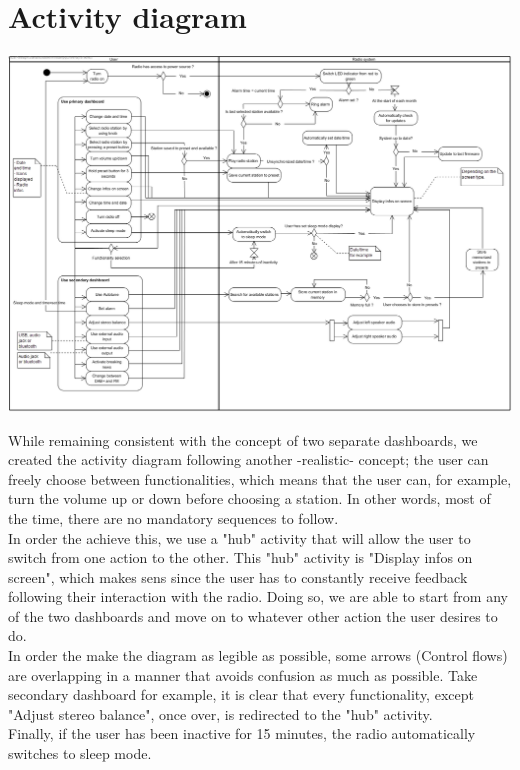 \documentclass[11pt]{article}
\begin{document}
\pagebreak
\section{Activity diagram}
\vspace{10px}
\begin{center}
\includegraphics[width=15cm]{../Diagrams/Activity-v5.jpg}\\
\end{center}
While remaining consistent with the concept of two separate dashboards, we created the activity diagram following another -realistic- concept; the user can freely choose between functionalities, which means that the user can, for example, turn the volume up or down before choosing a station. In other words, most of the time, there are no mandatory sequences to follow.\\
In order the achieve this, we use a "hub" activity that will allow the user to switch from one action to the other. This "hub" activity is  "Display infos on screen", which makes sens since the user has to constantly receive feedback following their interaction with the radio. Doing so, we are able to start from any of the two dashboards and move on to whatever other action the user desires to do.\\
In order the make the diagram as legible as possible, some arrows (Control flows) are overlapping in a manner that avoids confusion as much as possible. Take secondary dashboard for example, it is clear that every functionality, except "Adjust stereo balance", once over, is redirected to the "hub" activity.\\
Finally, if the user has been inactive for 15 minutes, the radio automatically switches to sleep mode.
\end{document}
